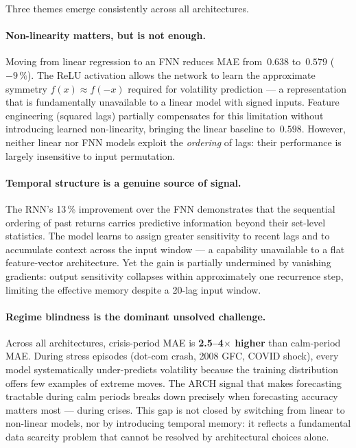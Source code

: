 Three themes emerge consistently across all architectures.

\paragraph{Non-linearity matters, but is not enough.}
Moving from linear regression to an FNN reduces MAE from~$0.638$ to~$0.579$
($-9\,\%$). The ReLU activation allows the network to learn the approximate
symmetry $f(x) \approx f(-x)$ required for volatility prediction --- a
representation that is fundamentally unavailable to a linear model with signed
inputs. Feature engineering (squared lags) partially compensates for this
limitation without introducing learned non-linearity, bringing the linear
baseline to~$0.598$. However, neither linear nor FNN models exploit the
\emph{ordering} of lags: their performance is largely insensitive to input
permutation.

\paragraph{Temporal structure is a genuine source of signal.}
The RNN's 13\,\% improvement over the FNN demonstrates that the sequential
ordering of past returns carries predictive information beyond their set-level
statistics. The model learns to assign greater sensitivity to recent lags and
to accumulate context across the input window --- a capability unavailable to a
flat feature-vector architecture. Yet the gain is partially undermined by
vanishing gradients: output sensitivity collapses within approximately one
recurrence step, limiting the effective memory despite a 20-lag input window.

\paragraph{Regime blindness is the dominant unsolved challenge.}
Across all architectures, crisis-period MAE is \textbf{2.5--4$\times$ higher}
than calm-period MAE. During stress episodes (dot-com crash, 2008 GFC, COVID
shock), every model systematically under-predicts volatility because the
training distribution offers few examples of extreme moves. The ARCH signal
that makes forecasting tractable during calm periods breaks down precisely when
forecasting accuracy matters most --- during crises. This gap is not closed by
switching from linear to non-linear models, nor by introducing temporal memory:
it reflects a fundamental data scarcity problem that cannot be resolved by
architectural choices alone.

